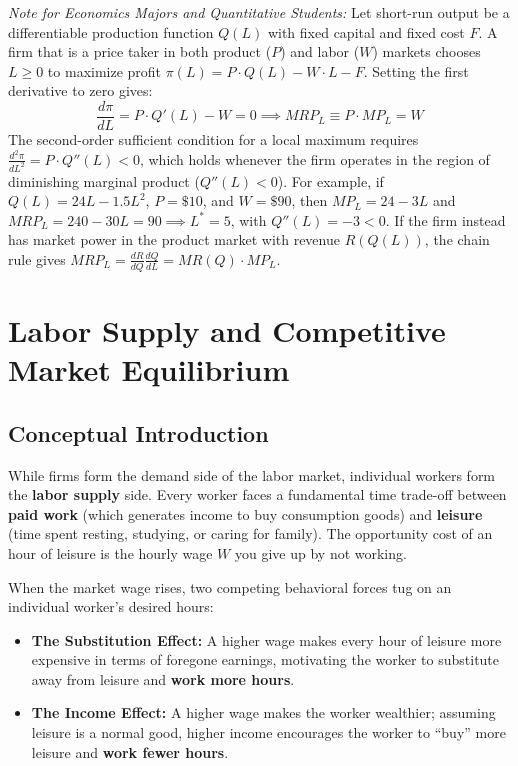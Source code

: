 \documentclass[11pt,letterpaper]{article}
\begin{document}
\begin{tcolorbox}[colback=SlateBlue!5!white,colframe=SlateBlue!85!black,title=\textbf{Optional Advanced Section: Calculus of Profit-Maximizing Labor Demand}]
\small
\emph{Note for Economics Majors and Quantitative Students:}
Let short-run output be a differentiable production function $Q(L)$ with fixed capital and fixed cost $F$. A firm that is a price taker in both product ($P$) and labor ($W$) markets chooses $L \ge 0$ to maximize profit $\pi(L) = P \cdot Q(L) - W \cdot L - F$. Setting the first derivative to zero gives:
\[
\frac{d\pi}{dL} = P \cdot Q'(L) - W = 0 \implies MRP_L \equiv P \cdot MP_L = W
\]
The second-order sufficient condition for a local maximum requires $\frac{d^2\pi}{dL^2} = P \cdot Q''(L) < 0$, which holds whenever the firm operates in the region of diminishing marginal product ($Q''(L) < 0$). For example, if $Q(L) = 24L - 1.5L^2$, $P = \$10$, and $W = \$90$, then $MP_L = 24 - 3L$ and $MRP_L = 240 - 30L = 90 \implies L^* = 5$, with $Q''(L) = -3 < 0$. If the firm instead has market power in the product market with revenue $R(Q(L))$, the chain rule gives $MRP_L = \frac{dR}{dQ}\frac{dQ}{dL} = MR(Q) \cdot MP_L$.
\end{tcolorbox}

\section{Labor Supply and Competitive Market Equilibrium}

\subsection*{Conceptual Introduction}
While firms form the demand side of the labor market, individual workers form the \textbf{labor supply} side. Every worker faces a fundamental time trade-off between \textbf{paid work} (which generates income to buy consumption goods) and \textbf{leisure} (time spent resting, studying, or caring for family). The opportunity cost of an hour of leisure is the hourly wage $W$ you give up by not working.

When the market wage rises, two competing behavioral forces tug on an individual worker's desired hours:
\begin{itemize}
    \item \textbf{The Substitution Effect:} A higher wage makes every hour of leisure more expensive in terms of foregone earnings, motivating the worker to substitute away from leisure and \textbf{work more hours}.
    \item \textbf{The Income Effect:} A higher wage makes the worker wealthier; assuming leisure is a normal good, higher income encourages the worker to ``buy'' more leisure and \textbf{work fewer hours}.
\end{itemize}
\end{document}
